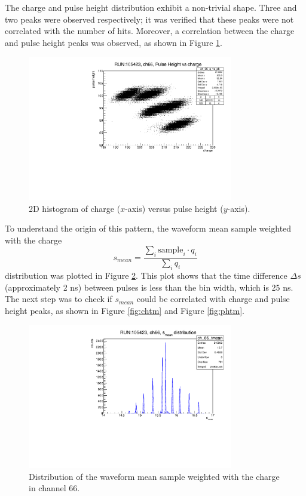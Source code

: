 The charge and pulse height distribution exhibit a non-trivial shape. 
Three and two peaks were observed respectively; it was verified that 
these peaks were not correlated with the number of hits. Moreover, a 
correlation between the charge and pulse height peaks was observed, as shown in Figure \ref{fig:chvsph}. 
\begin{figure}[!h]
  \centering
  \includegraphics[width=0.8\textwidth]{figures/pdf/phch1.pdf}
  \caption{2D histogram of charge ($x$-axis) versus pulse height ($y$-axis).}
  \label{fig:chvsph}
\end{figure}
To understand the origin of this pattern, the waveform mean sample weighted with the charge 
\begin{equation} 
  s_{mean} = \frac{\sum_i \text{sample}_i \cdot q_i }{\sum_i q_i} 
\end{equation}
distribution was plotted in Figure \ref{fig:smean}. 
This plot shows that the time difference $\Delta s$ (approximately 2 ns) between pulses is less than the bin width, which is 25 ns. 
The next step was to check if $s_{mean}$ could be correlated with charge and pulse height peaks, 
as shown in Figure \ref{fig:chtm} and Figure \ref{fig:phtm}.
\begin{figure}[!h]
  \centering
  \includegraphics[width=0.8\textwidth]{figures/pdf/tmean1.pdf}
  \caption{Distribution of the waveform mean sample weighted with the charge in channel 66.}
  \label{fig:smean}
\end{figure}
